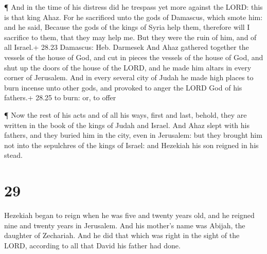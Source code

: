  ¶ And in the time of his distress did he trespass yet more
against the LORD: this is that king Ahaz.  For he
sacrificed unto the gods of Damascus, which smote him: and he said,
Because the gods of the kings of Syria help them, therefore will I
sacrifice to them, that they may help me. But they were the ruin of him,
and of all Israel.+ 28.23 Damascus: Heb. Darmesek  And Ahaz
gathered together the vessels of the house of God, and cut in pieces the
vessels of the house of God, and shut up the doors of the house of the
LORD, and he made him altars in every corner of Jerusalem. 
And in every several city of Judah he made high places to burn incense
unto other gods, and provoked to anger the LORD God of his fathers.+
28.25 to burn: or, to offer

 ¶ Now the rest of his acts and of all his ways, first and
last, behold, they are written in the book of the kings of Judah and
Israel.  And Ahaz slept with his fathers, and they buried
him in the city, even in Jerusalem: but they brought him not into the
sepulchres of the kings of Israel: and Hezekiah his son reigned in his
stead.

\hypertarget{section-28}{%
\section{29}\label{section-28}}

 Hezekiah began to reign when he was five and twenty years
old, and he reigned nine and twenty years in Jerusalem. And his mother's
name was Abijah, the daughter of Zechariah.  And he did that
which was right in the sight of the LORD, according to all that David
his father had done.

